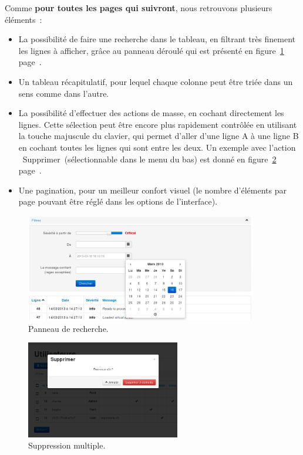 Comme \textbf{pour toutes les pages qui suivront}, nous retrouvons plusieurs éléments~:

\begin{itemize}
\item La possibilité de faire une recherche dans le tableau, en filtrant très finement les lignes à afficher, grâce au panneau déroulé qui est présenté en figure~\ref{filters} page~\pageref{filters}.
\item Un tableau récapitulatif, pour lequel chaque colonne peut être triée dans un sens comme dans l'autre.
\item La possibilité d'effectuer des actions de masse, en cochant directement les lignes. Cette sélection peut être encore plus rapidement contrôlée en utilisant la touche majuscule du clavier, qui permet d'aller d'une ligne A à une ligne B en cochant toutes les lignes qui sont entre les deux. Un exemple avec l'action \og~Supprimer~\fg (sélectionnable dans le menu du bas) est donné en figure~\ref{massdel} page~\pageref{massdel}.
\item Une pagination, pour un meilleur confort visuel (le nombre d'éléments par page pouvant être réglé dans les options de l'interface).
\end{itemize}

\begin{figure}[!h]
	\begin{center}
	    \includegraphics[width=0.9\textwidth]{img/logsfilters.png}
	\end{center}
	\caption{Panneau de recherche.}
	\label{filters}
\end{figure}

\begin{figure}[!h]
	\begin{center}
	    \includegraphics[width=0.6\textwidth]{img/massdel.png}
	\end{center}
	\caption{Suppression multiple.}
	\label{massdel}
\end{figure}

